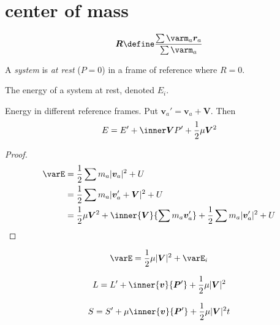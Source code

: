\documentclass{scrbook}
\numberwithin{thms}{chapter}
\renewcommand{\vec}[1]{\bm{#1}}
\begin{document}
\section{center of mass}
\renewcommand{\varR}{\vec R}
\renewcommand{\varr}{\vec r}
\begin{defn}
  \[
    \varR \define \frac{\sum \varm_a\varr_a}{\sum \varm_a}
  \]
\end{defn}
A \emph{system} is \emph{at rest} ($P=0$) in a frame of reference where $R=0$. 
\vspace{1ex}
\begin{defn}
  The energy of a system at rest, denoted $E_i$.
\end{defn}
\renewcommand{\varv}{\vec v}
\renewcommand{\varV}{\vec V}

\begin{theorem}
  Energy in different reference frames.
  Put $\varv_a'=\varv_a+\varV$. Then
  \[
    E=E'+\inner \varV {P'} + \frac12 \mu \varV^2
  \]
\end{theorem}
\begin{proof}
  \begin{align*}
    \varE&= \frac12 \sum m_a |\varv_a|^2 + U \\
         &=\frac12 \sum m_a |\varv_a'+\varV|^2 + U \\
         &=\frac12 \mu \varV^2  + \inner{\varV}{\sum m_a\varv_a'}+\frac 12 \sum m_a|\varv_a'|^2 +U
  \end{align*}
\end{proof}
\renewcommand{\varV}{|\vec V|}
\begin{cor}
  \[
    \varE = \frac{1}{2} \mu \varV^2+\varE_i
  \]
\end{cor}
\begin{cor}
  \[
    L=L'+\inner{\varv}{\varP'}+\frac 12 \mu \varV^2
  \]
\end{cor}
\begin{cor}
  \[
    S=S'+\mu\inner{\varv}{\varP'}+\frac12 \mu \varV^2t
  \]
\end{cor}
\end{document}
